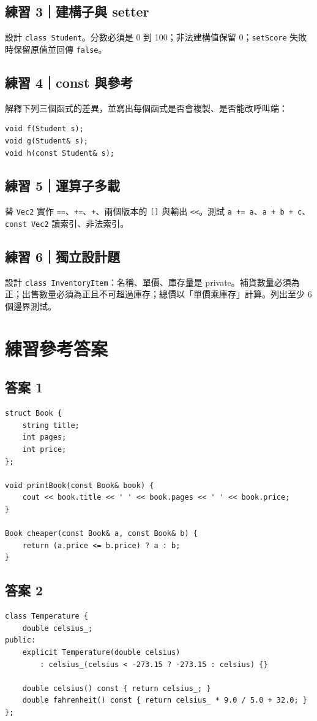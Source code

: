 \documentclass[11pt,a4paper]{article}
\newcommand{\code}[1]{\texttt{#1}}
\begin{document}
\subsection*{練習 3｜建構子與 setter}
設計 \code{class Student}。分數必須是 0 到 100；非法建構值保留 0；\code{setScore} 失敗時保留原值並回傳 \code{false}。

\subsection*{練習 4｜const 與參考}
解釋下列三個函式的差異，並寫出每個函式是否會複製、是否能改呼叫端：
\begin{lstlisting}
void f(Student s);
void g(Student& s);
void h(const Student& s);
\end{lstlisting}

\subsection*{練習 5｜運算子多載}
替 \code{Vec2} 實作 \code{==}、\code{+=}、\code{+}、兩個版本的 \code{[]} 與輸出 \code{<<}。測試 \code{a += a}、\code{a + b + c}、\code{const Vec2} 讀索引、非法索引。

\subsection*{練習 6｜獨立設計題}
設計 \code{class InventoryItem}：名稱、單價、庫存量是 private。補貨數量必須為正；出售數量必須為正且不可超過庫存；總價以「單價乘庫存」計算。列出至少 6 個邊界測試。

\clearpage
\section{練習參考答案}

\subsection*{答案 1}
\begin{lstlisting}
struct Book {
    string title;
    int pages;
    int price;
};

void printBook(const Book& book) {
    cout << book.title << ' ' << book.pages << ' ' << book.price;
}

Book cheaper(const Book& a, const Book& b) {
    return (a.price <= b.price) ? a : b;
}
\end{lstlisting}

\subsection*{答案 2}
\begin{lstlisting}
class Temperature {
    double celsius_;
public:
    explicit Temperature(double celsius)
        : celsius_(celsius < -273.15 ? -273.15 : celsius) {}

    double celsius() const { return celsius_; }
    double fahrenheit() const { return celsius_ * 9.0 / 5.0 + 32.0; }
};
\end{lstlisting}
\end{document}
